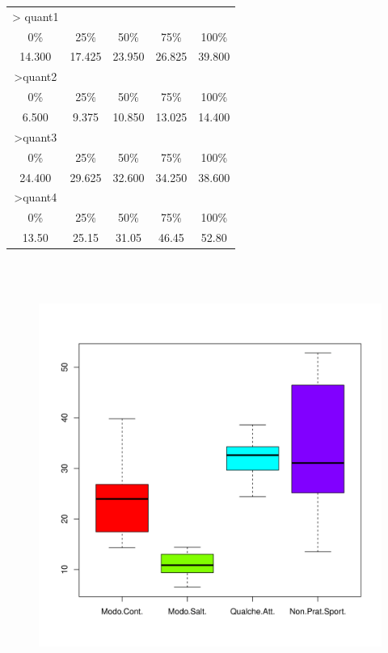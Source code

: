 \vspace{5mm}
\begin{tabular}{ c c c c c }
 > quant1 \\
 0\% & 25\% & 50\% & 75\% & 100\% \\ 
 14.300 & 17.425 & 23.950 & 26.825 & 39.800\\

 >quant2 \\
 0\% & 25\% & 50\% & 75\% & 100\% \\ 
 6.500 & 9.375 & 10.850 & 13.025 & 14.400\\

 >quant3 \\
 0\% & 25\% & 50\% & 75\% & 100\% \\ 
 24.400 & 29.625 & 32.600 & 34.250 & 38.600\\

  >quant4 \\
 0\% & 25\% & 50\% & 75\% & 100\% \\ 
 13.50 & 25.15 & 31.05 & 46.45 & 52.80\\
\end{tabular}
\vspace{5mm}

\begin{figure}[!htbp]
    \centering
    \includegraphics[height=14cm]{ProgettoSAD/capitoli/images/s_desc_univ/quantili_boxplot.png}
    \label{fig:quantili_boxplot}
\end{figure}

